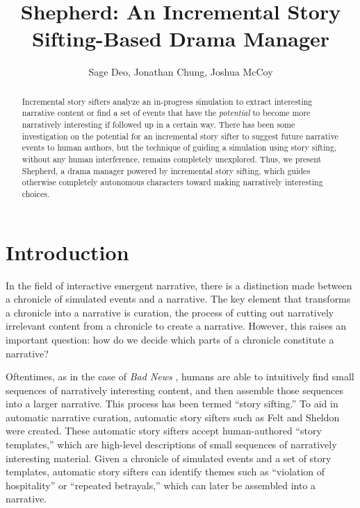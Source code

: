 \documentclass[letterpaper]{article}
\title{Shepherd: An Incremental Story Sifting-Based Drama Manager}
\author {
    Sage Deo,
    Jonathan Chung,
    Joshua McCoy
}
\begin{document}
\maketitle

\begin{abstract}
    Incremental story sifters analyze an in-progress simulation to extract interesting
    narrative content or find a set of events that have the \textit{potential} to become
    more narratively interesting if followed up in a certain way. There has been some
    investigation on the potential for an incremental story sifter to suggest future
    narrative events to human authors, but the technique of guiding a simulation using
    story sifting, without any human interference, remains completely unexplored. Thus, we
    present Shepherd, a drama manager powered by incremental story sifting, which guides
    otherwise completely autonomous characters toward making narratively interesting
    choices. 
\end{abstract}

\section{Introduction}
In the field of interactive emergent narrative, there is a distinction made between a
chronicle of simulated events and a narrative. The key element that transforms a chronicle
into a narrative is curation, the process of cutting out narratively irrelevant content
from a chronicle to create a narrative. However, this raises an important question: how do
we decide which parts of a chronicle constitute a narrative?

Oftentimes, as in the case of \textit{Bad News} \cite{samuel:badnews}, humans are able to
intuitively find small sequences of narratively interesting content, and then assemble
those sequences into a larger narrative. This process has been termed “story sifting.” To
aid in automatic narrative curation, automatic story sifters such as Felt
\cite{kreminski:felt} and Sheldon \cite{ryan:curating} were created. These automatic story
sifters accept human-authored “story templates,” which are high-level descriptions of
small sequences of narratively interesting material. Given a chronicle of simulated events
and a set of story templates, automatic story sifters can identify themes such as
“violation of hospitality” or “repeated betrayals,” which can later be assembled into a
narrative. 
\end{document}
